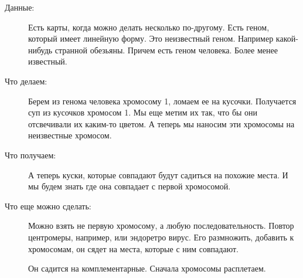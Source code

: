 \begin{description}
\item[Данные:] Есть карты, когда можно делать несколько по-другому. Есть геном, 
который имеет линейную форму. Это неизвестный геном. Например 
какой-нибудь странной обезьяны. Причем есть 
геном человека. Более менее известный.

\item[Что делаем:]
Берем из генома человека хромосому 1, ломаем ее на кусочки. 
Получается суп из кусочков хромосом 1. Мы еще метим их так, 
что бы они отсвечивали их каким-то цветом. А теперь 
мы наносим эти хромосомы на неизвестные хромосом. 

\item[Что получаем:]
А теперь куски, которые совпадают будут садиться на 
похожие места. И мы будем знать где она совпадает 
с первой хромосомой. 

\item[Что еще можно сделать:]
Можно взять не первую хромосому, а любую последовательность. 
Повтор центромеры, например, или эндоретро вирус. Его размножить, 
добавить к хромосомам, он сядет на места, которые с ним совпадают. 

Он садится на комплементарные. Сначала хромосомы расплетаем. 
\end{description}

